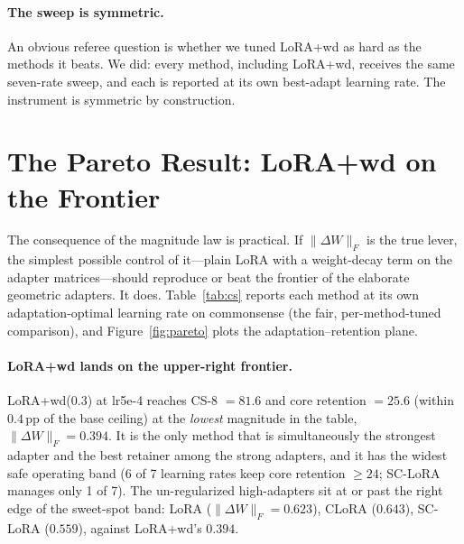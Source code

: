 \documentclass[11pt]{article}
\newcommand{\dw}{\lVert\Delta W\rVert_F}
\begin{document}


\paragraph{The sweep is symmetric.} An obvious referee question is whether we tuned
LoRA{+}wd as hard as the methods it beats. We did: every method, including LoRA{+}wd,
receives the same seven-rate sweep, and each is reported at its own best-adapt learning
rate. The instrument is symmetric by construction.

\section{The Pareto Result: LoRA{+}wd on the Frontier}\label{sec:pareto}
The consequence of the magnitude law is practical. If $\dw$ is the true lever, the
simplest possible control of it---plain LoRA with a weight-decay term on the adapter
matrices---should reproduce or beat the frontier of the elaborate geometric adapters.
It does. Table~\ref{tab:cs} reports each method at its own adaptation-optimal learning
rate on commonsense (the fair, per-method-tuned comparison), and Figure~\ref{fig:pareto}
plots the adaptation--retention plane.

\begin{table}[t]
  \centering
  
  \caption{\textbf{Main commonsense results} (Llama-2-7B, seed 42), each method at its
  best-adapt learning rate. LoRA{+}wd(0.3) is simultaneously the highest-adaptation
  (81.6), highest-core-retention among the strong adapters (25.6, essentially the base
  ceiling 26.0), and lowest-magnitude ($\dw\!=\!0.394$) method. CorDA is excluded pending
  re-validation (Section~\ref{sec:limits}).}
  \label{tab:cs}
\end{table}

\paragraph{LoRA{+}wd lands on the upper-right frontier.} LoRA{+}wd(0.3) at lr5e-4 reaches
CS-8 $=\!81.6$ and core retention $=\!25.6$ (within $0.4$\,pp of the base ceiling) at the
\emph{lowest} magnitude in the table, $\dw\!=\!0.394$. It is the only method that is
simultaneously the strongest adapter and the best retainer among the strong adapters,
and it has the widest safe operating band (6 of 7 learning rates keep core retention
$\geq\!24$; SC-LoRA manages only 1 of 7). The un-regularized high-adapters sit at or past
the right edge of the sweet-spot band: LoRA ($\dw\!=\!0.623$), CLoRA ($0.643$), SC-LoRA
($0.559$), against LoRA{+}wd's $0.394$.
\end{document}
